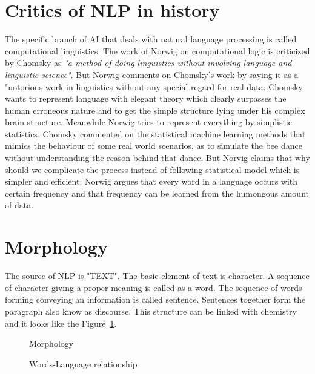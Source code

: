 \documentclass{bmcart}
\begin{document}
\section{Critics of NLP in history}
\label{sec:critics}
The specific branch of AI that deals with natural language processing is called computational linguistics. The work of Norwig on computational logic is criticized by Chomsky as \textit{"a method of doing linguistics without involving language and linguistic science"}. But Norwig comments on Chomsky's work by saying it as a "notorious work in linguistics without any special regard for real-data. Chomsky wants to represent language with elegant theory which clearly surpasses the human erroneous nature and to get the simple structure lying under his complex brain structure. Meanwhile Norwig tries to represent everything by simplistic statistics. Chomsky commented on the statistical machine learning methods that mimics the behaviour of some real world scenarios, as to simulate the bee dance without understanding the reason behind that dance. But Norvig claims that why should we complicate the process instead of following statistical model which is simpler and efficient. Norwig argues that every word in a language occurs with certain frequency and that frequency can be learned from the humongous amount of data.


\section{Morphology}
\label{sec:morphology}

The source of NLP is "TEXT". The basic element of text is character. A sequence of character giving a proper meaning is called as a word. The sequence of words forming conveying an information is called sentence. Sentences together form the paragraph also know as discourse. This structure can be linked with chemistry and it looks like the Figure~\ref{fig:morphology}.

\begin{figure}[h!tb]
\centering
\begin{minipage}{0.5\textwidth}
	\centering
	\caption{Morphology}
	\label{fig:morphology}
\end{minipage}%
\begin{minipage}{0.5\textwidth}
	\centering
	\caption{Words-Language relationship}
	\label{fig:morphology}
\end{minipage}
\end{figure}
\end{document}
